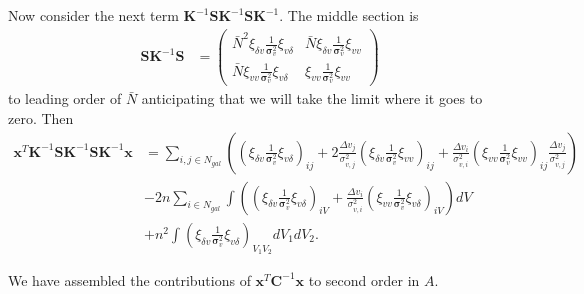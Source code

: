 \documentclass{article}
\begin{document}
Now consider the next term $\textbf{K}^{-1}\textbf{S}\textbf{K}^{-1}\textbf{S}\textbf{K}^{-1}$.  The middle section is
\begin{align}
\textbf{S}\textbf{K}^{-1}\textbf{S} & =
\begin{pmatrix}
 \bar{N}^2  \xi_{\delta v}\frac{1}{\bm{\sigma}_v^2}  \xi_{v \delta}  & \bar{N} \xi_{\delta v} \frac{1} {\bm{\sigma}_v^2} \xi_{vv}  \\
 \bar{N} \xi_{v v} \frac{1} {\bm{\sigma}_v^2} \xi_{v \delta}   &  \xi_{vv} \frac{1}{\bm{\sigma}_v^2} \xi_{vv}
\end{pmatrix}
\end{align}
to leading order of $\bar{N}$ anticipating that we will take the limit where it goes to zero.
Then
\begin{align}
\textbf{x}^T \textbf{K}^{-1}\textbf{S}\textbf{K}^{-1}\textbf{S}\textbf{K}^{-1} \textbf{x}
& = \sum_{i,j\in N_{gal}} \left( \left(\xi_{\delta v}\frac{1}{\bm{\sigma}_v^2}  \xi_{v \delta}\right)_{ij}
 + 2  \frac{\Delta v_j}{\sigma_{v,j}^2} \left(\xi_{\delta v} \frac{1} {\bm{\sigma}_v^2} \xi_{vv}  \right)_{ij} + \frac{\Delta v_i}{\sigma_{v,i}^2} \left( \xi_{vv} \frac{1}{\bm{\sigma}_v^2} \xi_{vv}\right)_{ij} \frac{\Delta v_j}{\sigma_{v,j}^2}\right)\\
&-2 n \sum_{i\in N_{gal}}\int \left( \left(\xi_{\delta v}\frac{1}{\bm{\sigma}_v^2}  \xi_{v \delta}\right)_{iV} + \frac{\Delta v_i}{\sigma_{v,i}^2} \left( \xi_{v v} \frac{1} {\bm{\sigma}_v^2} \xi_{v \delta}  \right)_{iV} \right) dV\\
& +n^2  \int  \left(\xi_{\delta v}\frac{1}{\bm{\sigma}_v^2}  \xi_{v \delta}\right)_{V_1V_2}dV_1dV_2.
\end{align}

We have assembled the contributions of $\textbf{x}^T \textbf{C}^{-1}\textbf{x}$ to second order in $A$.
\end{document}
